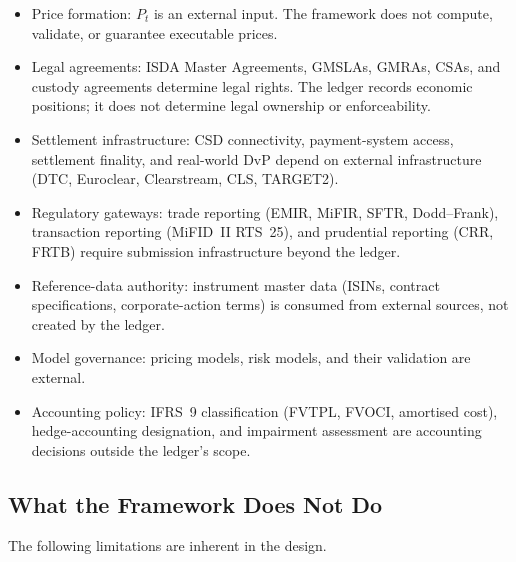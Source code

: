 \begin{itemize}[nosep]
\item Price formation: $P_t$ is an external input. The framework does not compute, validate, or guarantee executable prices.
\item Legal agreements: ISDA Master Agreements, GMSLAs, GMRAs, CSAs, and custody agreements determine legal rights. The ledger records economic positions; it does not determine legal ownership or enforceability.
\item Settlement infrastructure: CSD connectivity, payment-system access, settlement finality, and real-world DvP depend on external infrastructure (DTC, Euroclear, Clearstream, CLS, TARGET2).
\item Regulatory gateways: trade reporting (EMIR, MiFIR, SFTR, Dodd--Frank), transaction reporting (MiFID~II RTS~25), and prudential reporting (CRR, FRTB) require submission infrastructure beyond the ledger.
\item Reference-data authority: instrument master data (ISINs, contract specifications, corporate-action terms) is consumed from external sources, not created by the ledger.
\item Model governance: pricing models, risk models, and their validation are external.
\item Accounting policy: IFRS~9 classification (FVTPL, FVOCI, amortised cost), hedge-accounting designation, and impairment assessment are accounting decisions outside the ledger's scope.
\end{itemize}

\subsection{What the Framework Does Not Do}

The following limitations are inherent in the design.

